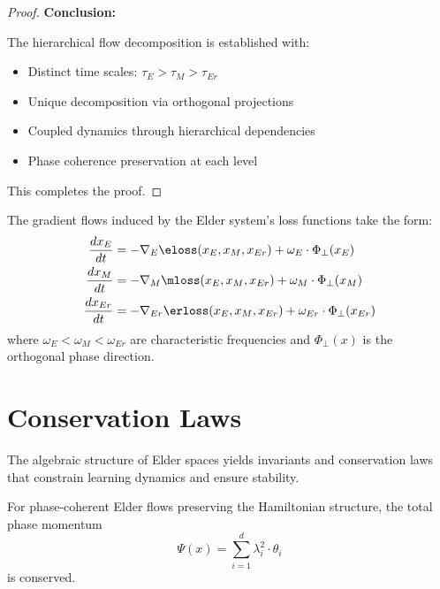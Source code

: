 \begin{proof}
\textbf{Conclusion:}

The hierarchical flow decomposition is established with:
\begin{itemize}
\item Distinct time scales: $\tau_E > \tau_M > \tau_{Er}$
\item Unique decomposition via orthogonal projections
\item Coupled dynamics through hierarchical dependencies
\item Phase coherence preservation at each level
\end{itemize}

This completes the proof.
\end{proof}

The gradient flows induced by the Elder system's loss functions take the form:
\begin{align}
\frac{dx_E}{dt} &= -\nabla_E \eloss(x_E, x_M, x_{Er}) + \omega_E \cdot \Phi_{\perp}(x_E)\\
\frac{dx_M}{dt} &= -\nabla_M \mloss(x_E, x_M, x_{Er}) + \omega_M \cdot \Phi_{\perp}(x_M)\\
\frac{dx_{Er}}{dt} &= -\nabla_{Er} \erloss(x_E, x_M, x_{Er}) + \omega_{Er} \cdot \Phi_{\perp}(x_{Er})
\end{align}
where $\omega_E < \omega_M < \omega_{Er}$ are characteristic frequencies and $\Phi_{\perp}(x)$ is the orthogonal phase direction.

\section{Conservation Laws}

The algebraic structure of Elder spaces yields invariants and conservation laws that constrain learning dynamics and ensure stability.

\begin{theorem}
\label{thm:phase_conservation}
For phase-coherent Elder flows preserving the Hamiltonian structure, the total phase momentum
\begin{equation}
\Psi(x) = \sum_{i=1}^{d} \lambda_i^2 \cdot \theta_i
\end{equation}
is conserved.
\end{theorem}

